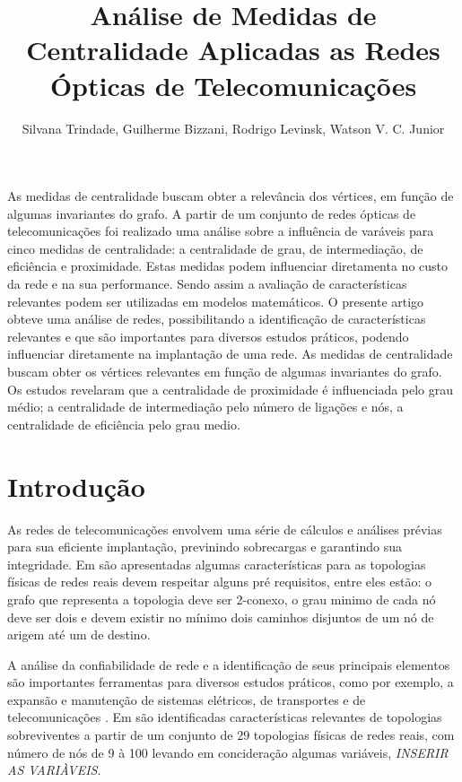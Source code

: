 \documentclass[12pt]{article}
\title{Análise de Medidas de Centralidade Aplicadas as Redes Ópticas de Telecomunicações}
\author{Silvana Trindade\inst{1}, Guilherme Bizzani\inst{1}, Rodrigo Levinsk\inst{1}, Watson V. C. Junior\inst{1}}
\begin{document}
 

\maketitle

\begin{abstract}
 
\end{abstract}
\begin{resumo} 

As medidas de centralidade buscam obter a relevância dos vértices, em função de algumas invariantes do grafo.
 A partir de um conjunto de redes ópticas de telecomunicações foi realizado uma análise sobre a influência de varáveis para cinco medidas de centralidade: a centralidade de grau, de intermediação, de eficiência e proximidade.
 Estas medidas podem influenciar diretamenta no custo da rede e na sua performance.
 Sendo assim a avaliação de características relevantes podem ser utilizadas em modelos matemáticos.
O presente artigo obteve uma análise de redes, possibilitando a identificação de características relevantes e que são importantes para diversos estudos práticos, podendo influenciar diretamente na implantação de uma rede.
As medidas de centralidade buscam obter os vértices relevantes em função de algumas invariantes do grafo.
 Os estudos revelaram que a centralidade de proximidade é influenciada pelo grau médio; a centralidade de intermediação pelo número de ligações e nós, a centralidade de eficiência pelo grau medio.

\end{resumo}


\section{Introdução}
As redes de telecomunicações envolvem uma série de cálculos e análises prévias para sua eficiente implantação, previnindo sobrecargas e garantindo sua integridade.
Em \cite{pavan} são apresentadas algumas características para as topologias físicas de redes reais devem respeitar alguns pré requisitos, entre eles estão: o grafo que representa a topologia deve ser  2-conexo, o grau minimo de cada nó deve ser dois e devem existir no mínimo dois caminhos disjuntos de um nó de arigem até um de destino.

A análise da confiabilidade de rede e a identificação de seus principais elementos são importantes ferramentas para diversos estudos práticos, como por exemplo, a expansão e manutenção de sistemas elétricos, de transportes e de telecomunicações \cite{silva}.
Em \cite{pavan} são identificadas características relevantes de topologias sobreviventes a partir de um conjunto de $29$ topologias físicas de redes reais, com número de nós de 9 à 100 levando em concideração algumas variáveis, \textit{INSERIR AS VARIÀVEIS}. 
\end{document}
